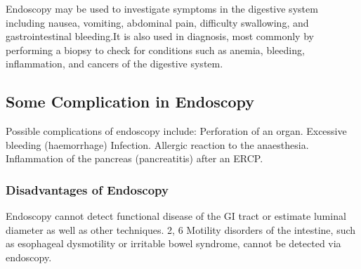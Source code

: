 \documentclass[12pt]{article}
\begin{document}
Endoscopy may be used to investigate symptoms in the digestive system including nausea, vomiting, abdominal pain, difficulty swallowing, and gastrointestinal bleeding.It is also used in diagnosis, most commonly by performing a biopsy to check for conditions such as anemia, bleeding, inflammation, and cancers of the digestive system.



\subsection{Some Complication in Endoscopy}

Possible complications of endoscopy include: Perforation of an organ.\newline
Excessive bleeding (haemorrhage)\newline
Infection.\newline
Allergic reaction to the anaesthesia.\newline
Inflammation of the pancreas (pancreatitis) after an ERCP.
\subsubsection{Disadvantages of Endoscopy}


Endoscopy cannot detect functional disease of the GI tract or estimate luminal diameter as well as other techniques. 2, 6 Motility disorders of the intestine, such as esophageal dysmotility or irritable bowel syndrome, cannot be detected via endoscopy.
\end{document}
